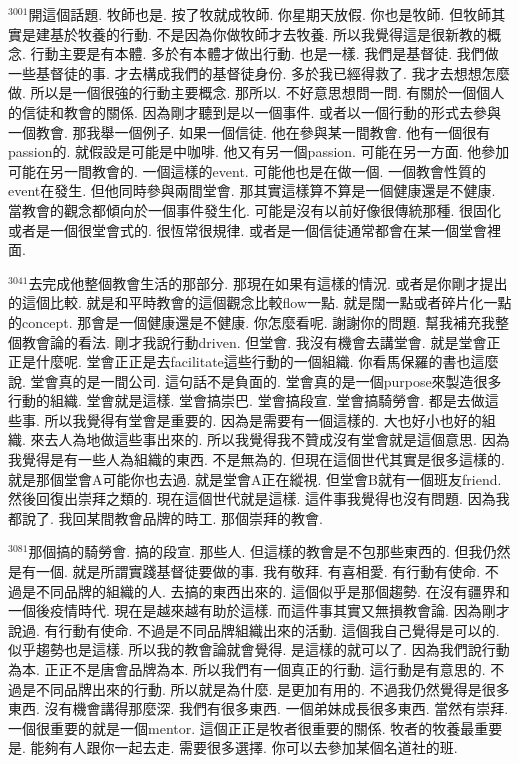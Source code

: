 \documentclass{book}
\begin{document}
$^{3001}$開這個話題.
牧師也是.
按了牧就成牧師.
你星期天放假.
你也是牧師.
但牧師其實是建基於牧養的行動.
不是因為你做牧師才去牧養.
所以我覺得這是很新教的概念.
行動主要是有本體.
多於有本體才做出行動.
也是一樣.
我們是基督徒.
我們做一些基督徒的事.
才去構成我們的基督徒身份.
多於我已經得救了.
我才去想想怎麼做.
所以是一個很強的行動主要概念.
那所以.
不好意思想問一問.
有關於一個個人的信徒和教會的關係.
因為剛才聽到是以一個事件.
或者以一個行動的形式去參與一個教會.
那我舉一個例子.
如果一個信徒.
他在參與某一間教會.
他有一個很有passion的.
就假設是可能是中咖啡.
他又有另一個passion.
可能在另一方面.
他參加可能在另一間教會的.
一個這樣的event.
可能他也是在做一個.
一個教會性質的event在發生.
但他同時參與兩間堂會.
那其實這樣算不算是一個健康還是不健康.
當教會的觀念都傾向於一個事件發生化.
可能是沒有以前好像很傳統那種.
很固化或者是一個很堂會式的.
很恆常很規律.
或者是一個信徒通常都會在某一個堂會裡面.

$^{3041}$去完成他整個教會生活的那部分.
那現在如果有這樣的情況.
或者是你剛才提出的這個比較.
就是和平時教會的這個觀念比較flow一點.
就是闊一點或者碎片化一點的concept.
那會是一個健康還是不健康.
你怎麼看呢.
謝謝你的問題.
幫我補充我整個教會論的看法.
剛才我說行動driven.
但堂會.
我沒有機會去講堂會.
就是堂會正正是什麼呢.
堂會正正是去facilitate這些行動的一個組織.
你看馬保羅的書也這麼說.
堂會真的是一間公司.
這句話不是負面的.
堂會真的是一個purpose來製造很多行動的組織.
堂會就是這樣.
堂會搞崇巴.
堂會搞段宣.
堂會搞騎勞會.
都是去做這些事.
所以我覺得有堂會是重要的.
因為是需要有一個這樣的.
大也好小也好的組織.
來去人為地做這些事出來的.
所以我覺得我不贊成沒有堂會就是這個意思.
因為我覺得是有一些人為組織的東西.
不是無為的.
但現在這個世代其實是很多這樣的.
就是那個堂會A可能你也去過.
就是堂會A正在縱視.
但堂會B就有一個班友friend.
然後回復出崇拜之類的.
現在這個世代就是這樣.
這件事我覺得也沒有問題.
因為我都說了.
我回某間教會品牌的時工.
那個崇拜的教會.

$^{3081}$那個搞的騎勞會.
搞的段宣.
那些人.
但這樣的教會是不包那些東西的.
但我仍然是有一個.
就是所謂實踐基督徒要做的事.
我有敬拜.
有喜相愛.
有行動有使命.
不過是不同品牌的組織的人.
去搞的東西出來的.
這個似乎是那個趨勢.
在沒有疆界和一個後疫情時代.
現在是越來越有助於這樣.
而這件事其實又無損教會論.
因為剛才說過.
有行動有使命.
不過是不同品牌組織出來的活動.
這個我自己覺得是可以的.
似乎趨勢也是這樣.
所以我的教會論就會覺得.
是這樣的就可以了.
因為我們說行動為本.
正正不是唐會品牌為本.
所以我們有一個真正的行動.
這行動是有意思的.
不過是不同品牌出來的行動.
所以就是為什麼.
是更加有用的.
不過我仍然覺得是很多東西.
沒有機會講得那麼深.
我們有很多東西.
一個弟妹成長很多東西.
當然有崇拜.
一個很重要的就是一個mentor.
這個正正是牧者很重要的關係.
牧者的牧養最重要是.
能夠有人跟你一起去走.
需要很多選擇.
你可以去參加某個名道社的班.
\end{document}
